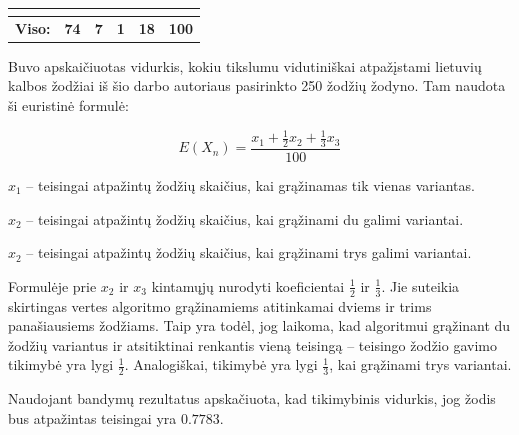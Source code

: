\documentclass[a4paper,12pt]{article}
\begin{document}
\begin{table}[H]
\begin{tabular}{llllll}
		& \textbf{}                                                                              & \textbf{}                                                                               & \textbf{}                                                                               & \textbf{}                                                                                                   & \textbf{}                                                                                                          \\ \hline
		\multicolumn{1}{|l|}{\textbf{Viso:}}                                                                   & \multicolumn{1}{l|}{\textbf{74}}                                                       & \multicolumn{1}{l|}{\textbf{7}}                                                         & \multicolumn{1}{l|}{\textbf{1}}                                                         & \multicolumn{1}{l|}{\textbf{18}}                                                                            & \multicolumn{1}{l|}{\textbf{100}}                                                                                  \\ \hline
	\end{tabular}
\end{table}

Buvo apskaičiuotas vidurkis, kokiu tikslumu vidutiniškai atpažįstami lietuvių kalbos žodžiai iš šio darbo autoriaus pasirinkto 250 žodžių žodyno. Tam naudota ši euristinė formulė: 

\[ E(X_n) = \frac{x_1 + \frac{1}{2}x_2 + \frac{1}{3}x_3}{100} \]

$x_1$ – teisingai atpažintų žodžių skaičius, kai grąžinamas tik vienas variantas.

$x_2$ – teisingai atpažintų žodžių skaičius, kai grąžinami du galimi variantai.

$x_2$ – teisingai atpažintų žodžių skaičius, kai grąžinami trys galimi variantai.

Formulėje prie $x_2$ ir $x_3$ kintamųjų nurodyti koeficientai \(\frac{1}{2}\) ir \(\frac{1}{3}\). Jie suteikia skirtingas vertes algoritmo grąžinamiems atitinkamai dviems ir trims panašiausiems žodžiams. Taip yra todėl, jog laikoma, kad algoritmui grąžinant du žodžių variantus ir atsitiktinai renkantis vieną teisingą – teisingo žodžio gavimo tikimybė yra lygi \(\frac{1}{2}\). Analogiškai, tikimybė yra lygi \(\frac{1}{3}\), kai grąžinami trys variantai.
 
Naudojant bandymų rezultatus apskačiuota, kad tikimybinis vidurkis, jog žodis bus atpažintas teisingai yra \( 0.7783 \).
\end{document}
